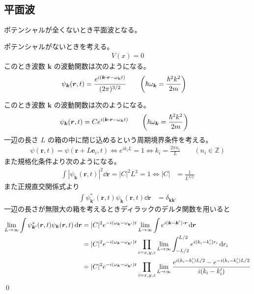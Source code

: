 \documentclass[uplatex,dvipdfmx,a4paper,11pt]{jlreq}
\makeatletter
\newcommand{\ZZ}{\mathbb{Z}}
\newcommand{\rr}{\bm{r}}
\newcommand{\kk}{\bm{k}}
\numberwithin{equation}{section}
\theoremstyle{definition}
\renewenvironment{proof}[1][\proofname]{\par
  \normalfont
  \topsep6\p@\@plus6\p@ \trivlist
  \item[\hskip\labelsep{\bfseries #1}\@addpunct{\bfseries}]\ignorespaces\quad\par
}{%
  \qed\endtrivlist\@endpefalse
}
\renewcommand\proofname{証明}
\makeatother
\begin{document}
\subsection{平面波}
ポテンシャルが全くないとき平面波となる。
\begin{proposition}
  ポテンシャルがないときを考える。
  \begin{align}
    V(x) = 0
  \end{align}
  このとき波数 $\kk$ の波動関数は次のようになる。
  \begin{align}
    \psi_{\kk}(\rr, t) & = \frac{e^{i(\kk\vdot\rr - \omega_{\kk}t)}}{(2\pi)^{3/2}} \qquad \qty(\hbar\omega_{\kk} = \frac{\hbar^2k^2}{2m})
  \end{align}
\end{proposition}
\begin{proof}
  このとき波数 $\kk$ の波動関数は次のようになる。
  \begin{align}
    \psi_{\kk}(\rr, t) & = Ce^{i(\kk\vdot\rr - \omega_{\kk}t)} \qquad \qty(\hbar\omega_{\kk} = \frac{\hbar^2k^2}{2m})
  \end{align}
  一辺の長さ $L$ の箱の中に閉じ込めるという周期境界条件を考える。
  \begin{align}
    \psi(\rr, t) = \psi(\rr + L\bm{e}_i, t) \iff e^{ik_iL} = 1 \iff k_i = \frac{2\pi n_i}{L} \qquad (n_i\in\ZZ)
  \end{align}
  また規格化条件より次のようになる。
  \begin{align}
    \int|\psi_{\kk}(\rr, t)|^2\dd{\rr} = |C|^2L^3 = 1 \iff |C| & = \frac{1}{L^{3/2}}
  \end{align}
  また正規直交関係式より
  \begin{align}
    \int\psi_{\kk'}^*(\rr, t)\psi_{\kk}(\rr, t)\dd{\rr} & = \delta_{\kk\kk'}
  \end{align}
  一辺の長さが無限大の箱を考えるときディラックのデルタ関数を用いると
  \begin{align}
    \lim_{L\to\infty}\int\psi_{\kk'}^*(\rr, t)\psi_{\kk}(\rr, t)\dd{\rr} & = |C|^2e^{-i(\omega_{\kk} - \omega_{\kk'})t}\lim_{L\to\infty}\int e^{i(\kk - \kk')\vdot\rr}\dd{\rr}                                            \\
                                                                         & = |C|^2e^{-i(\omega_{\kk} - \omega_{\kk'})t}\prod_{i=x,y,z}\lim_{L\to\infty}\int_{-L/2}^{L/2} e^{i(k_i - k_i')r_i}\dd{r_i}                     \\
                                                                         & = |C|^2e^{-i(\omega_{\kk} - \omega_{\kk'})t}\prod_{i=x,y,z}\lim_{L\to\infty}\frac{e^{i(k_i - k_i')L/2} - e^{-i(k_i - k_i')L/2}}{i(k_i - k_i')} \\

\end{align}
\end{proof}
\end{document}
